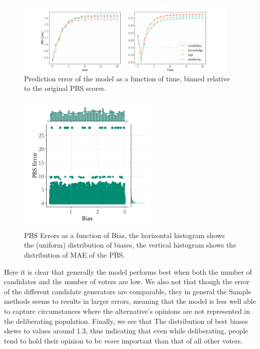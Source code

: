 \begin{figure}
	\begin{center}
		\includegraphics[width=0.95\textwidth]{Figures/errors_binned.png}
	\end{center}
	\caption{Prediction error of the model as a function of time, binned relative to the original PBS scores.}\label{fig:binned_errors}
\end{figure}


\begin{figure}
	\centering

	\includegraphics[width=0.6\textwidth]{Figures/delib_bias_error.png}
	\hspace{1em}
	\caption{PBS Errors as a function of Bias, the horizontal histogram shows the (uniform) distribution of biases, the vertical histogram shows the distribution of MAE of the PBS.}\label{fig:bias_over_time}
\end{figure}


Here it is clear that generally the model performs best when both the number of
candidates and the number of voters are low. We also not that though the error
of the different candidate generators are comparable, they in general the
Sample methods seems to results in larger errors, meaning that the model is
less well able to capture circumstances where the alternative's opinions are
not represented in the deliberating population. Finally, we see that The
distribution of best biases skews to values around 1.3, thus indicating that
even while deliberating, people tend to hold their opinion to be \textit{more}
important than that of all other voters.

